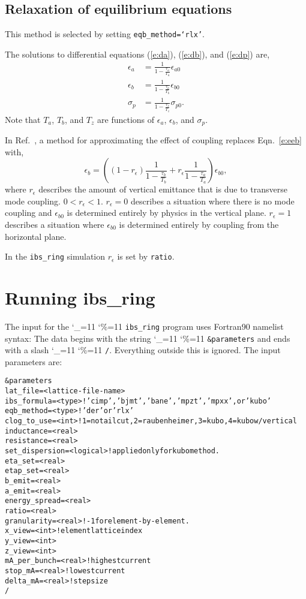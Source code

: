 \documentclass[11pt]{article}
\newcommand\ttcmd{\begingroup\catcode`\_=11 \catcode`\%=11 \dottcmd}
\newcommand\dottcmd[1]{\texttt{#1}\endgroup}
\newcommand{\vn}{\ttcmd}
\newlength{\ExBeg}
\newlength{\ExEnd}
\newenvironment{example}
  {\vspace{\ExBeg} \begin{alltt}}
  {\end{alltt} \vspace{\ExEnd}}
\begin{document}
\subsection{Relaxation of equilibrium equations}
This method is selected by setting {\tt eqb_method=`rlx'}.

The solutions to differential equations (\ref{e:da}), (\ref{e:db}), and (\ref{e:dp}) are,
\begin{align}
\epsilon_a&=\frac{1}{1-\frac{\tau_a}{T_a}}\epsilon_{a0}\label{e:eea}\\
\epsilon_b&=\frac{1}{1-\frac{\tau_b}{T_b}}\epsilon_{b0}\label{e:eeb}\\
\sigma_p&=\frac{1}{1-\frac{\tau_z}{T_z}}\sigma_{p0}\label{e:eep}.
\end{align}
Note that $T_a$, $T_b$, and $T_z$ are functions of $\epsilon_a$, $\epsilon_b$, and $\sigma_p$.

In Ref.~\cite{b:wolski}, a method for approximating the effect of coupling replaces Eqn.~\ref{e:eeb}
with,
\begin{equation}
\epsilon_b=\left(\left(1-r_\epsilon\right)\frac{1}{1-\frac{\tau_b}{T_b}}+
r_\epsilon\frac{1}{1-\frac{\tau_a}{T_a}}\right)\epsilon_{b0},
\end{equation}
where $r_\epsilon$ describes the amount of vertical emittance that is due to transverse mode coupling.
$0<r_\epsilon<1$.
$r_\epsilon=0$ describes a situation where there is no mode coupling and $\epsilon_{b0}$ is
determined entirely by physics in the vertical plane.  $r_\epsilon=1$ describes a situation
where $\epsilon_{b0}$ is determined entirely by coupling from the horizontal plane.

In the {\tt ibs\_ring} simulation $r_\epsilon$ is set by {\tt ratio}.


\section{Running ibs_ring} 
\label{s:run}

The input for the \vn{ibs_ring} program uses Fortran90 namelist
syntax: The data begins with the string \vn{\&parameters} and ends
with a slash \vn{/}. Everything outside this is ignored.
The input parameters are:
\begin{example}
\&parameters
  lat_file = <lattice-file-name>
  ibs_formula = <type>  ! 'cimp', 'bjmt', 'bane', 'mpzt', 'mpxx', or 'kubo'
  eqb_method = <type>   ! 'der' or 'rlx'
  clog_to_use = <int>   ! 1=no tail cut, 2=raubenheimer, 3=kubo, 4=kubo w/vertical
  inductance = <real>
  resistance = <real>
  set_dispersion = <logical> ! applied only for kubo method.
  eta_set = <real>
  etap_set = <real>
  b_emit = <real>
  a_emit = <real>
  energy_spread = <real>
  ratio = <real>
  granularity = <real>   ! -1 for element-by-element.
  x_view = <int>  ! element lattice index 
  y_view = <int>  
  z_view = <int>  
  mA_per_bunch = <real>  ! highest current
  stop_mA = <real>       ! lowest current
  delta_mA = <real>      ! step size
/
\end{example}
\end{document}
